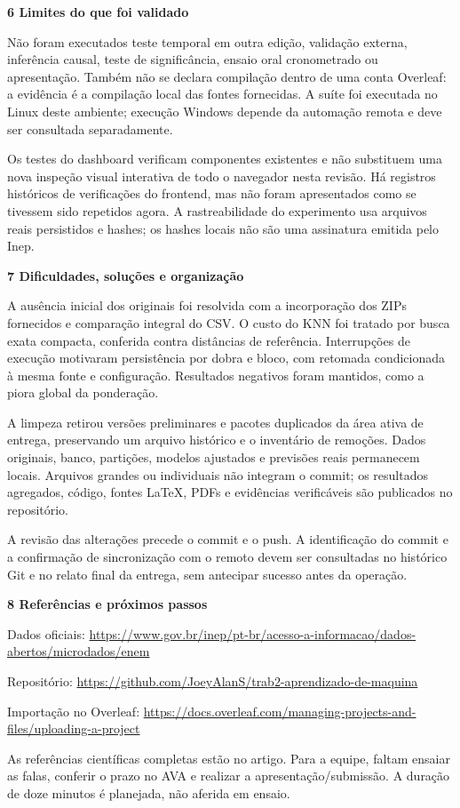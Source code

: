 \documentclass[12pt,a4paper]{article}
\newcommand{\heading}[1]{\par\Needspace{4\baselineskip}\noindent\textbf{#1}\par\vspace{5pt}}
\begin{document}
\heading{6 Limites do que foi validado}
Não foram executados teste temporal em outra edição, validação externa, inferência causal, teste de significância, ensaio oral cronometrado ou apresentação. Também não se declara compilação dentro de uma conta Overleaf: a evidência é a compilação local das fontes fornecidas. A suíte foi executada no Linux deste ambiente; execução Windows depende da automação remota e deve ser consultada separadamente.


Os testes do dashboard verificam componentes existentes e não substituem uma nova inspeção visual interativa de todo o navegador nesta revisão. Há registros históricos de verificações do frontend, mas não foram apresentados como se tivessem sido repetidos agora. A rastreabilidade do experimento usa arquivos reais persistidos e hashes; os hashes locais não são uma assinatura emitida pelo Inep.


\heading{7 Dificuldades, soluções e organização}
A ausência inicial dos originais foi resolvida com a incorporação dos ZIPs fornecidos e comparação integral do CSV. O custo do KNN foi tratado por busca exata compacta, conferida contra distâncias de referência. Interrupções de execução motivaram persistência por dobra e bloco, com retomada condicionada à mesma fonte e configuração. Resultados negativos foram mantidos, como a piora global da ponderação.


A limpeza retirou versões preliminares e pacotes duplicados da área ativa de entrega, preservando um arquivo histórico e o inventário de remoções. Dados originais, banco, partições, modelos ajustados e previsões reais permanecem locais. Arquivos grandes ou individuais não integram o commit; os resultados agregados, código, fontes LaTeX, PDFs e evidências verificáveis são publicados no repositório.


A revisão das alterações precede o commit e o push. A identificação do commit e a confirmação de sincronização com o remoto devem ser consultadas no histórico Git e no relato final da entrega, sem antecipar sucesso antes da operação.


\heading{8 Referências e próximos passos}
Dados oficiais: \url{https://www.gov.br/inep/pt-br/acesso-a-informacao/dados-abertos/microdados/enem}


Repositório: \url{https://github.com/JoeyAlanS/trab2-aprendizado-de-maquina}


Importação no Overleaf: \url{https://docs.overleaf.com/managing-projects-and-files/uploading-a-project}


As referências científicas completas estão no artigo. Para a equipe, faltam ensaiar as falas, conferir o prazo no AVA e realizar a apresentação/submissão. A duração de doze minutos é planejada, não aferida em ensaio.
\end{document}
